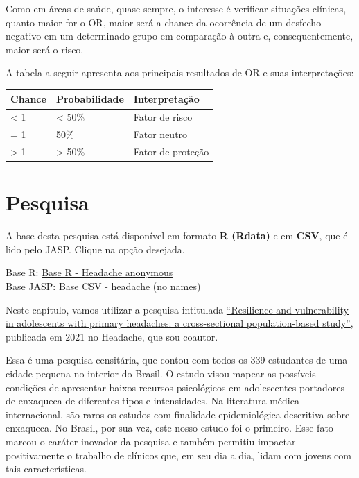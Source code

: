 \documentclass[
]{book}
\newenvironment{base}{
  \definecolor{shadecolor}{rgb}{0.972,0.972,0.972}  %
  \color{black}
  \begin{shaded}}
 {\end{shaded}}
\begin{document}
Como em áreas de saúde, quase sempre, o interesse é verificar situações clínicas, quanto maior for o OR, maior será a chance da ocorrência de um desfecho negativo em um determinado grupo em comparação à outra e, consequentemente, maior será o risco.

A tabela a seguir apresenta aos principais resultados de OR e suas interpretações:

\begin{longtable}[]{@{}lll@{}}
\toprule
Chance & Probabilidade & Interpretação\tabularnewline
\midrule
\endhead
\textless{} 1 & \textless{} 50\% & Fator de risco\tabularnewline
= 1 & 50\% & Fator neutro\tabularnewline
\textgreater{} 1 & \textgreater{} 50\% & Fator de proteção\tabularnewline
\bottomrule
\end{longtable}

\hypertarget{pesquisa-11}{%
\section{Pesquisa}\label{pesquisa-11}}

\begin{base}
A base desta pesquisa está disponível em formato \textbf{R (Rdata)} e em \textbf{CSV}, que é lido pelo JASP. Clique na opção desejada.

Base R: \href{https://github.com/anovabr/mqt/raw/master/bases/Base\%20R\%20-\%20Headache\%20anonymous.RData}{Base R - Headache anonymous}\\
Base JASP: \href{https://github.com/anovabr/mqt/raw/master/bases/bases_csv_jasp.zip}{Base CSV - headache (no names)}

\end{base}

Neste capítulo, vamos utilizar a pesquisa intitulada \href{www.google.com}{``Resilience and vulnerability in adolescents with primary headaches: a cross-sectional population-based study''}, publicada em 2021 no Headache, que sou coautor.

Essa é uma pesquisa censitária, que contou com todos os 339 estudantes de uma cidade pequena no interior do Brasil. O estudo visou mapear as possíveis condições de apresentar baixos recursos psicológicos em adolescentes portadores de enxaqueca de diferentes tipos e intensidades. Na literatura médica internacional, são raros os estudos com finalidade epidemiológica descritiva sobre enxaqueca. No Brasil, por sua vez, este nosso estudo foi o primeiro. Esse fato marcou o caráter inovador da pesquisa e também permitiu impactar positivamente o trabalho de clínicos que, em seu dia a dia, lidam com jovens com tais características.
\end{document}
